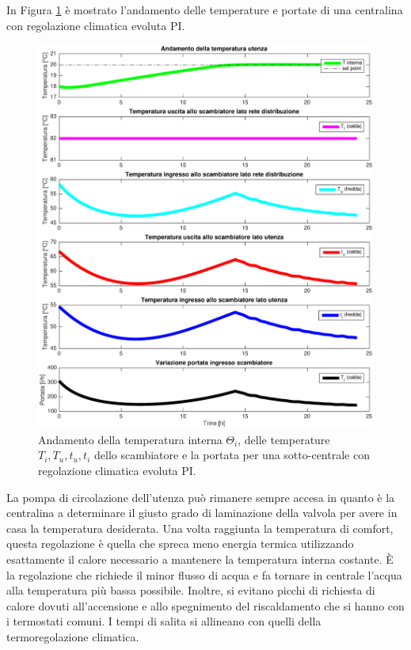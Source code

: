 \documentclass[laurea,oneside,11pt]{USiena_tesiLM3}
\begin{document}
In Figura \ref{fig:reg_PID} è mostrato l'andamento delle temperature e portate di una centralina con regolazione climatica evoluta PI.

\begin{figure}[!ht]
\centering
\includegraphics[width=\textwidth]{figure/reg_PID} 
\caption{Andamento della temperatura interna $\Theta_i$, delle temperature $T_i, T_u, t_u, t_i$ dello scambiatore e la portata per una sotto-centrale con regolazione climatica evoluta PI.}
\label{fig:reg_PID}
\end{figure}

La pompa di circolazione dell'utenza può rimanere sempre accesa in quanto è la centralina a determinare il giusto grado di laminazione della valvola per avere in casa la temperatura desiderata. 
 Una volta raggiunta la temperatura di comfort, questa regolazione è quella che spreca meno energia termica utilizzando esattamente il calore necessario a mantenere la temperatura interna costante. È la regolazione che richiede il minor flusso di acqua e fa tornare in centrale l'acqua alla temperatura più bassa possibile.  Inoltre, si evitano picchi di richiesta di calore dovuti all'accensione e allo spegnimento del riscaldamento che si hanno con i termostati comuni. I tempi di salita si allineano con quelli della termoregolazione climatica.
\end{document}
